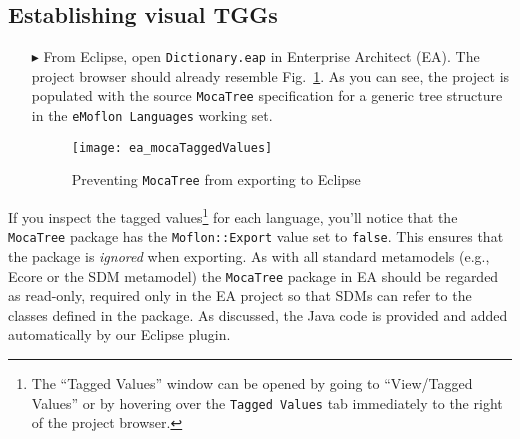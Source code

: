 \newpage
\hypertarget{initialize vis}{}
\subsection{Establishing visual TGGs}
\visHeader

\begin{itemize}

\item[$\blacktriangleright$] From Eclipse, open \texttt{Dict\-ion\-ary.eap} in Enterprise Architect (EA). The project browser should already resemble
Fig.~\ref{ea:mocaTagged}. As you can see, the project is populated with the source \texttt{MocaTree} specification for a generic tree structure in the
\texttt{eMoflon Languages} working set.

\vspace{0.5cm}

\begin{figure}[htpb]
\begin{center}
  \texttt{[image: ea\_mocaTaggedValues]}
  \caption{Preventing \texttt{MocaTree} from exporting to Eclipse}
  \label{ea:mocaTagged}
\end{center}
\end{figure}

\end{itemize}
\vspace{-0.5cm}
If you inspect the tagged values\footnote{The ``Tagged Values'' window can be opened by going to ``View/Tagged Values'' or by hovering over the \texttt{Tagged
Values} tab immediately to the right of the project browser.} for each language, you'll notice that the \texttt{MocaTree} package has the
\texttt{Moflon::Export} value set to \texttt{false}.
This ensures that the package is \emph{ignored} when exporting. As with all standard metamodels (e.g., Ecore or the SDM metamodel) the \texttt{MocaTree} package in EA should be regarded as read-only, required only in the
EA project so that SDMs can refer to the classes defined in the package. As discussed, the Java code is provided and added automatically by our Eclipse plugin.

